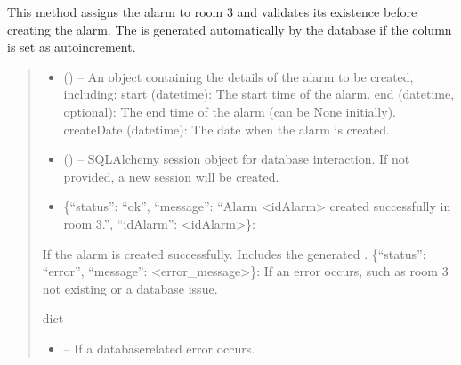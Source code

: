 \documentclass[letterpaper,10pt,english]{sphinxmanual}
\begin{document}
\begin{fulllineitems}
\begin{fulllineitems}
\sphinxAtStartPar
This method assigns the alarm to room 3 and validates its existence before creating the alarm.
The  is generated automatically by the database if the column is set as auto\sphinxhyphen{}increment.
\begin{quote}\begin{description}
\begin{itemize}
\item {} 
\sphinxAtStartPar
{} () – An object containing the details of the alarm to be created, including:
\sphinxhyphen{} start (datetime): The start time of the alarm.
\sphinxhyphen{} end (datetime, optional): The end time of the alarm (can be None initially).
\sphinxhyphen{} createDate (datetime): The date when the alarm is created.

\item {} 
\sphinxAtStartPar
{} (\sphinxstyleliteralemphasis{\sphinxupquote{, }}) – SQLAlchemy session object for database interaction.
If not provided, a new session will be created.

\end{itemize}

\sphinxAtStartPar
\begin{description}
\begin{itemize}
\item {} 
\sphinxAtStartPar
\{“status”: “ok”, “message”: “Alarm <idAlarm> created successfully in room 3.”, “idAlarm”: <idAlarm>\}:

\end{itemize}

\sphinxAtStartPar
If the alarm is created successfully. Includes the generated .
\sphinxhyphen{} \{“status”: “error”, “message”: <error\_message>\}:
If an error occurs, such as room 3 not existing or a database issue.

\end{description}


\sphinxAtStartPar
dict

\begin{itemize}
\item {} 
\sphinxAtStartPar
{} – If a database\sphinxhyphen{}related error occurs.


\end{itemize}
\end{description}
\end{quote}
\end{fulllineitems}
\end{fulllineitems}
\end{document}
